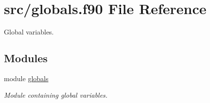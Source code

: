 \hypertarget{globals_8f90}{}\section{src/globals.f90 File Reference}
\label{globals_8f90}


Global variables.  


\subsection*{Modules}
\begin{DoxyCompactItemize}
\item 
module \hyperlink{namespaceglobals}{globals}
\begin{DoxyCompactList}\small\item\em Module containing global variables. \end{DoxyCompactList}\end{DoxyCompactItemize}
